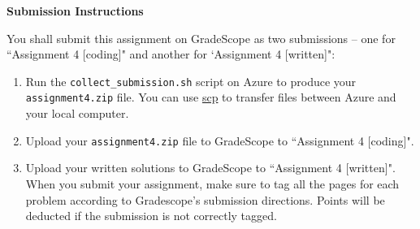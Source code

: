 \Large{\textbf{Submission Instructions}}

\normalsize
You shall submit this assignment on GradeScope as two submissions -- one for ``Assignment 4 [coding]" and another for `Assignment 4 [written]":
\begin{enumerate}
    \item Run the \texttt{collect\_submission.sh} script on Azure to produce your \texttt{assignment4.zip} file. You can use \href{http://www.hypexr.org/linux_scp_help.php}{scp} to transfer files between Azure and your local computer.
    \item Upload your \texttt{assignment4.zip} file to GradeScope to ``Assignment 4 [coding]".
    \item Upload your written solutions to GradeScope to ``Assignment 4 [written]". When you submit your assignment, make sure to tag all the pages for each problem according to Gradescope's submission directions. Points will be deducted if the submission is not correctly tagged.
\end{enumerate}